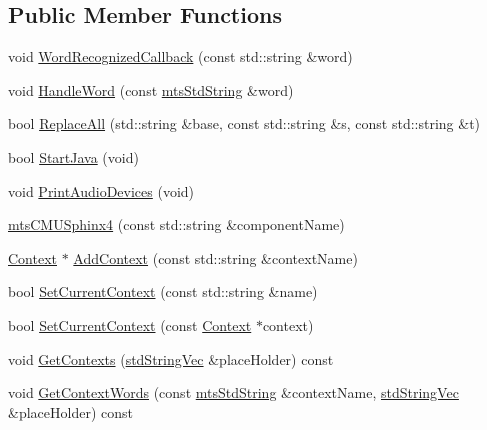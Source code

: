 \subsection*{Public Member Functions}
\begin{DoxyCompactItemize}
\item 
void \hyperlink{classmts_c_m_u_sphinx4_ac9243489a568cce1c463922dc0f79bbb}{Word\-Recognized\-Callback} (const std\-::string \&word)
\item 
void \hyperlink{classmts_c_m_u_sphinx4_a653084b6693c6f4414bc8dfa8f94162e}{Handle\-Word} (const \hyperlink{mts_generic_object_proxy_8h_adbc21bfbf98367e582bf8a263b7e711f}{mts\-Std\-String} \&word)
\item 
bool \hyperlink{classmts_c_m_u_sphinx4_adb303121fc94c17e9c57d11fb076febb}{Replace\-All} (std\-::string \&base, const std\-::string \&s, const std\-::string \&t)
\item 
bool \hyperlink{classmts_c_m_u_sphinx4_a1fa53d9230463e3fffc5da3d6d860bac}{Start\-Java} (void)
\item 
void \hyperlink{classmts_c_m_u_sphinx4_a820a87d010d678ea90ec349119b1157f}{Print\-Audio\-Devices} (void)
\item 
\hyperlink{classmts_c_m_u_sphinx4_ae0672d164dc504f26d68986684997d21}{mts\-C\-M\-U\-Sphinx4} (const std\-::string \&component\-Name)
\item 
\hyperlink{classmts_c_m_u_sphinx4_1_1_context}{Context} $\ast$ \hyperlink{classmts_c_m_u_sphinx4_a349e1ce0312d5921dcd2810977ff7545}{Add\-Context} (const std\-::string \&context\-Name)
\item 
bool \hyperlink{classmts_c_m_u_sphinx4_a5b072af7ea052d31764f28b598731d86}{Set\-Current\-Context} (const std\-::string \&name)
\item 
bool \hyperlink{classmts_c_m_u_sphinx4_aaf2723a879577249f27da70aeac5108a}{Set\-Current\-Context} (const \hyperlink{classmts_c_m_u_sphinx4_1_1_context}{Context} $\ast$context)
\item 
void \hyperlink{classmts_c_m_u_sphinx4_ad2db81a9bc569fb09174abdc524fa2af}{Get\-Contexts} (\hyperlink{mts_generic_object_proxy_8h_ae2238149254430b4959aa4e16892fc07}{std\-String\-Vec} \&place\-Holder) const 
\item 
void \hyperlink{classmts_c_m_u_sphinx4_a691e451e7489413f2aa73a9ffeb11014}{Get\-Context\-Words} (const \hyperlink{mts_generic_object_proxy_8h_adbc21bfbf98367e582bf8a263b7e711f}{mts\-Std\-String} \&context\-Name, \hyperlink{mts_generic_object_proxy_8h_ae2238149254430b4959aa4e16892fc07}{std\-String\-Vec} \&place\-Holder) const 

\end{DoxyCompactItemize}
